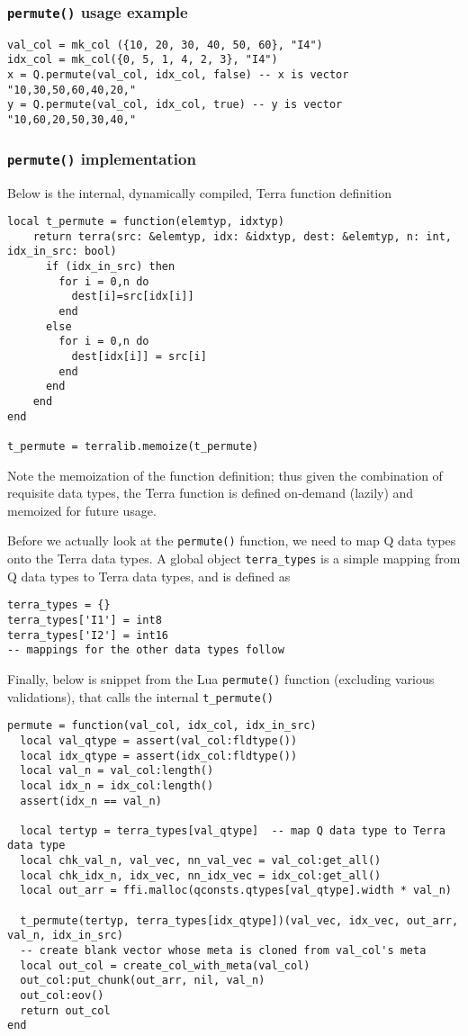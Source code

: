 \subsubsection{{\tt permute()} usage example}
\begin{verbatim}
val_col = mk_col ({10, 20, 30, 40, 50, 60}, "I4")
idx_col = mk_col({0, 5, 1, 4, 2, 3}, "I4")
x = Q.permute(val_col, idx_col, false) -- x is vector "10,30,50,60,40,20,"
y = Q.permute(val_col, idx_col, true) -- y is vector "10,60,20,50,30,40," 
\end{verbatim}

\subsubsection{{\tt permute()} implementation}
Below is the internal, dynamically compiled, Terra function definition

\begin{verbatim}
local t_permute = function(elemtyp, idxtyp)
    return terra(src: &elemtyp, idx: &idxtyp, dest: &elemtyp, n: int, idx_in_src: bool)
      if (idx_in_src) then
        for i = 0,n do
          dest[i]=src[idx[i]]
        end
      else
        for i = 0,n do
          dest[idx[i]] = src[i]
        end
      end
    end
end

t_permute = terralib.memoize(t_permute)
\end{verbatim}

Note the memoization of the function definition; thus given the combination of requisite data types, the Terra function is defined on-demand (lazily) and memoized for future usage.

Before we actually look at the {\tt permute()} function, we need to map Q data types onto the Terra data types. A global object {\tt terra\_types} is a simple mapping from Q data types to Terra data types, and is defined as
\begin{verbatim}
terra_types = {} 
terra_types['I1'] = int8
terra_types['I2'] = int16
-- mappings for the other data types follow
\end{verbatim}

Finally, below is snippet from the Lua {\tt permute()} function (excluding various validations), that calls the internal {\tt t\_permute()} 

\begin{verbatim}
permute = function(val_col, idx_col, idx_in_src)
  local val_qtype = assert(val_col:fldtype())
  local idx_qtype = assert(idx_col:fldtype())
  local val_n = val_col:length()
  local idx_n = idx_col:length()
  assert(idx_n == val_n)

  local tertyp = terra_types[val_qtype]  -- map Q data type to Terra data type
  local chk_val_n, val_vec, nn_val_vec = val_col:get_all()
  local chk_idx_n, idx_vec, nn_idx_vec = idx_col:get_all()
  local out_arr = ffi.malloc(qconsts.qtypes[val_qtype].width * val_n)

  t_permute(tertyp, terra_types[idx_qtype])(val_vec, idx_vec, out_arr, val_n, idx_in_src)
  -- create blank vector whose meta is cloned from val_col's meta
  local out_col = create_col_with_meta(val_col)  
  out_col:put_chunk(out_arr, nil, val_n) 
  out_col:eov()
  return out_col
end
\end{verbatim}

